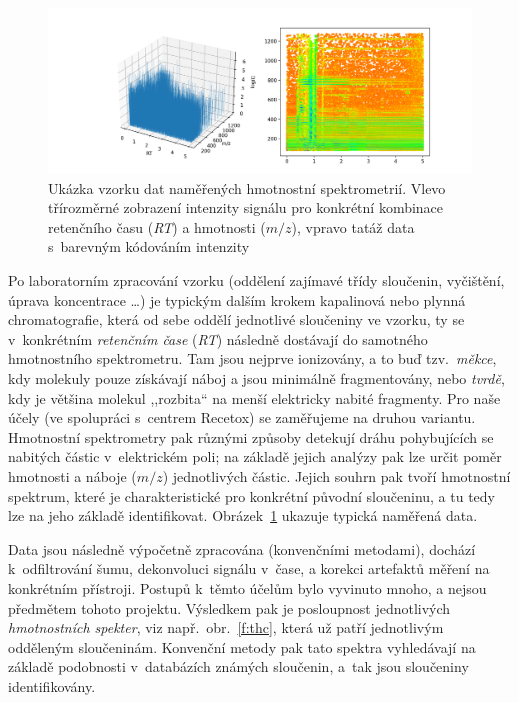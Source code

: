 \documentclass[a4paper,11pt]{article}
\begin{document}
\begin{figure}
\begin{center}
\includegraphics[width=.8\hsize]{sample}
\end{center}
\caption{Ukázka vzorku dat naměřených hmotnostní spektrometrií. Vlevo
třírozměrné zobrazení intenzity signálu pro konkrétní kombinace retenčního času
(\emph{RT}) a hmotnosti ($m/z$), vpravo tatáž data s~barevným kódováním intenzity}
 \label{f:ms}
\end{figure}


Po laboratorním zpracování vzorku (oddělení zajímavé třídy sloučenin, vyčištění, úprava koncentrace \dots)
je typickým dalším krokem kapalinová nebo plynná chromatografie, která od sebe oddělí jednotlivé sloučeniny
ve vzorku, ty se v~konkrétním \emph{retenčním čase} (\emph{RT}) následně dostávají do samotného hmotnostního spektrometru.
Tam jsou nejprve ionizovány, a to buď tzv.\ \emph{měkce},
kdy molekuly pouze získávají náboj a jsou minimálně fragmentovány,
nebo \emph{tvrdě}, kdy je většina molekul ,,rozbita`` na menší elektricky nabité fragmenty.
Pro naše účely (ve spolupráci s~centrem Recetox) se zaměřujeme na druhou variantu.
Hmotnostní spektrometry pak různými způsoby detekují dráhu pohybujících se nabitých částic v~elektrickém poli;
na základě jejich analýzy pak lze určit poměr hmotnosti a náboje ($m/z$) jednotlivých částic.
Jejich souhrn pak tvoří hmotnostní spektrum, které je charakteristické pro konkrétní původní sloučeninu,
a tu tedy lze na jeho základě identifikovat.
Obrázek~\ref{f:ms} ukazuje typická naměřená data.

Data jsou následně výpočetně zpracována (konvenčními metodami), dochází k~odfiltrování šumu, dekonvoluci signálu v~čase,
a korekci artefaktů měření na konkrétním přístroji.
Postupů k~těmto účelům bylo vyvinuto mnoho, a nejsou předmětem tohoto projektu.
Výsledkem pak je posloupnost jednotlivých \emph{hmotnostních spekter}, viz např.\ obr.~\ref{f:thc},
která už patří jednotlivým odděleným sloučeninám.
Konvenční metody pak tato spektra vyhledávají na základě podobnosti v~databázích známých sloučenin,
a~tak jsou sloučeniny identifikovány.
\end{document}
